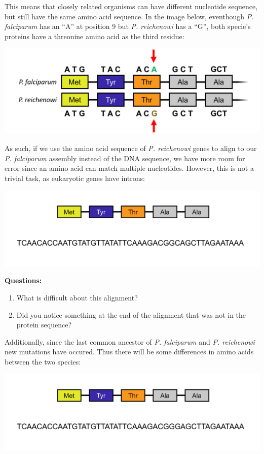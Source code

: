 \documentclass[11pt]{article}
\providecommand{\tightlist}{%
      \setlength{\itemsep}{0pt}\setlength{\parskip}{0pt}}
\begin{document}
This means that closely related organisms can have different nucleotide
sequence, but still have the same amino acid sequence. In the image
below, eventhough \textit{P. falciparum} has an ``A'' at position 9 but
\textit{P. reichenowi} has a ``G'', both specie's proteins have a
threonine amino acid as the third residue:

\includegraphics{images/comparative_3.png}

As such, if we use the amino acid sequence of \textit{P. reichenowi} genes
to align to our \textit{P. falciparum} assembly instead of the DNA
sequence, we have more room for error since an amino acid can match
multiple nucleotides. However, this is not a trivial task, as eukaryotic
genes have introns:

\includegraphics{images/comparative_activity_1.png}

\textbf{Questions:}

\begin{enumerate}
\def\labelenumi{\arabic{enumi}.}
\tightlist
\item
  What is difficult about this alignment?
\item
  Did you notice something at the end of the alignment that was not in
  the protein sequence?
\end{enumerate}

Additionally, since the last common ancestor of \textit{P. falciparum} and
\textit{P. reichenowi} new mutations have occured. Thus there will be some
differences in amino acids between the two species:

\includegraphics{images/comparative_activity_2.png}
\end{document}
